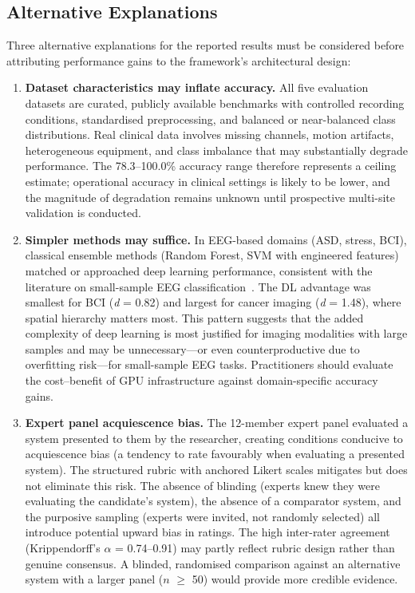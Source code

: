\iffalse
\subsection{Alternative Explanations}

Three alternative explanations for the reported results must be considered before attributing performance gains to the framework's architectural design:

\begin{enumerate}
    \item \textbf{Dataset characteristics may inflate accuracy.} All five evaluation datasets are curated, publicly available benchmarks with controlled recording conditions, standardised preprocessing, and balanced or near-balanced class distributions. Real clinical data involves missing channels, motion artifacts, heterogeneous equipment, and class imbalance that may substantially degrade performance. The 78.3--100.0\% accuracy range therefore represents a ceiling estimate; operational accuracy in clinical settings is likely to be lower, and the magnitude of degradation remains unknown until prospective multi-site validation is conducted.

    \item \textbf{Simpler methods may suffice.} In EEG-based domains (ASD, stress, BCI), classical ensemble methods (Random Forest, SVM with engineered features) matched or approached deep learning performance, consistent with the literature on small-sample EEG classification~\cite{craik2019eeg}. The DL advantage was smallest for BCI (\textit{d} = 0.82) and largest for cancer imaging (\textit{d} = 1.48), where spatial hierarchy matters most. This pattern suggests that the added complexity of deep learning is most justified for imaging modalities with large samples and may be unnecessary---or even counterproductive due to overfitting risk---for small-sample EEG tasks. Practitioners should evaluate the cost--benefit of GPU infrastructure against domain-specific accuracy gains.

    \item \textbf{Expert panel acquiescence bias.} The 12-member expert panel evaluated a system presented to them by the researcher, creating conditions conducive to acquiescence bias (a tendency to rate favourably when evaluating a presented system). The structured rubric with anchored Likert scales mitigates but does not eliminate this risk. The absence of blinding (experts knew they were evaluating the candidate's system), the absence of a comparator system, and the purposive sampling (experts were invited, not randomly selected) all introduce potential upward bias in ratings. The high inter-rater agreement (Krippendorff's $\alpha$ = 0.74--0.91) may partly reflect rubric design rather than genuine consensus. A blinded, randomised comparison against an alternative system with a larger panel ($n$ $\geq$ 50) would provide more credible evidence.
\end{enumerate}


